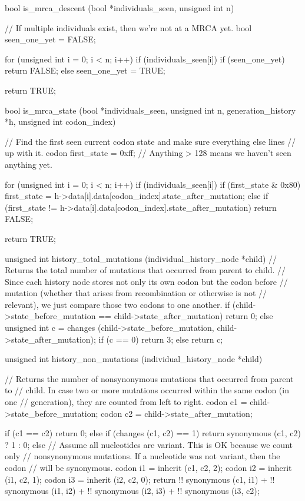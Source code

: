 \documentclass{article}
\begin{document}
\begin{ccode}
bool is_mrca_descent (bool *individuals_seen, unsigned int n) {
  // If multiple individuals exist, then we're not at a MRCA yet.
  bool seen_one_yet = FALSE;

  for (unsigned int i = 0; i < n; i++)
    if (individuals_seen[i]) {
      if (seen_one_yet)
	return FALSE;
      else
	seen_one_yet = TRUE;
    }

  return TRUE;
}

bool is_mrca_state (bool *individuals_seen, unsigned int n, generation_history *h,
		    unsigned int codon_index) {
  // Find the first seen current codon state and make sure everything else lines
  // up with it.
  codon first_state = 0xff; // Anything > 128 means we haven't seen anything yet.

  for (unsigned int i = 0; i < n; i++)
    if (individuals_seen[i]) {
      if (first_state & 0x80)
	first_state = h->data[i].data[codon_index].state_after_mutation;
      else if (first_state != h->data[i].data[codon_index].state_after_mutation)
	return FALSE;
    }

  return TRUE;
}

unsigned int history_total_mutations (individual_history_node *child) {
  // Returns the total number of mutations that occurred from parent to child.
  // Since each history node stores not only its own codon but the codon before
  // mutation (whether that arises from recombination or otherwise is not
  // relevant), we just compare those two codons to one another.
  if (child->state_before_mutation == child->state_after_mutation)
    return 0;
  else {
    unsigned int c = changes (child->state_before_mutation, child->state_after_mutation);
    if (c == 0)
      return 3;
    else
      return c;
  }
}

unsigned int history_non_mutations (individual_history_node *child) {
  // Returns the number of nonsynonymous mutations that occurred from parent to
  // child. In case two or more mutations occurred within the same codon (in one
  // generation), they are counted from left to right.
  codon c1 = child->state_before_mutation;
  codon c2 = child->state_after_mutation;

  if (c1 == c2)
    return 0;
  else if (changes (c1, c2) == 1)
    return synonymous (c1, c2) ? 1 : 0;
  else {
    // Assume all nucleotides are variant. This is OK because we count only
    // nonsynonymous mutations. If a nucleotide was not variant, then the codon
    // will be synonymous.
    codon i1 = inherit (c1, c2, 2);
    codon i2 = inherit (i1, c2, 1);
    codon i3 = inherit (i2, c2, 0);
    return !! synonymous (c1, i1) + !! synonymous (i1, i2) +
	   !! synonymous (i2, i3) + !! synonymous (i3, c2);
  }
}


\end{ccode}
\end{document}
